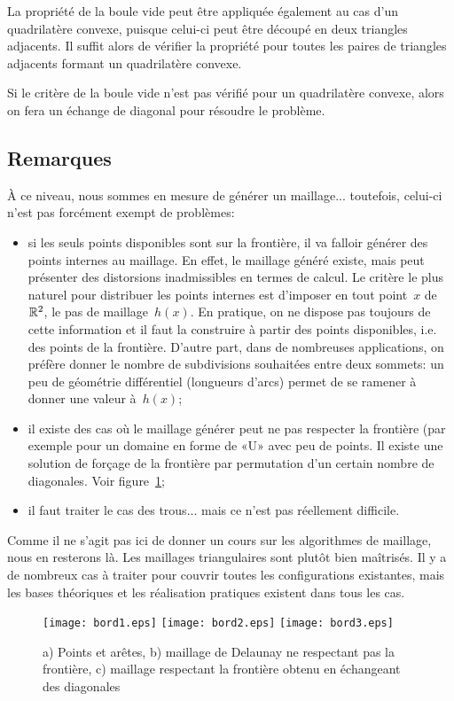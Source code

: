 \medskip
La propriété de la boule vide peut être appliquée également au cas d'un quadrilatère convexe, puisque celui-ci peut être découpé en deux triangles adjacents. Il suffit alors de vérifier la propriété pour toutes les paires de triangles adjacents formant un quadrilatère convexe.

Si le critère de la boule vide n'est pas vérifié pour un quadrilatère convexe, alors on fera un échange de diagonal pour résoudre le problème.

\medskip
\subsection{Remarques}

À ce niveau, nous sommes en mesure de générer un maillage... toutefois, celui-ci n'est pas forcément exempt de problèmes:
\begin{itemize}
   \item si les seuls points disponibles sont sur la frontière, il va falloir générer des points internes au maillage. En effet, le maillage généré existe, mais peut présenter des distorsions inadmissibles en termes de calcul. Le critère le plus naturel pour distribuer les points internes est d'imposer en tout point~$x$ de~$\mathbb R^2$, le pas de maillage~$h(x)$. En pratique, on ne dispose pas toujours de cette information et il faut la construire à partir des points disponibles, i.e. des points de la frontière. D'autre part, dans de nombreuses applications, on préfère donner le nombre de subdivisions souhaitées entre deux sommets: un peu de géométrie différentiel (longueurs d'arcs) permet de se ramener à donner une valeur à~$h(x)$;
   \item il existe des cas où le maillage générer peut ne pas respecter la frontière (par exemple pour un domaine en forme de «U» avec peu de points. Il existe une solution de forçage de la frontière par permutation d'un certain nombre de diagonales. Voir figure~\ref{Fig-Mbord};
   \item il faut traiter le cas des trous... mais ce n'est pas réellement difficile.
\end{itemize}
Comme il ne s'agit pas ici de donner un cours sur les algorithmes de maillage, nous en resterons là. Les maillages triangulaires sont plutôt bien maîtrisés. Il y a de nombreux cas à traiter pour couvrir toutes les configurations existantes, mais les bases théoriques et les réalisation pratiques existent dans tous les cas.
\begin{figure}[htb]
\begin{center}
\texttt{[image: bord1.eps]} \hspace{2em} \texttt{[image: bord2.eps]} \hspace{2em} \texttt{[image: bord3.eps]}
\end{center}
\caption{a) Points et arêtes, b) maillage de Delaunay ne respectant pas la frontière, c) maillage respectant la frontière obtenu en échangeant des diagonales}\label{Fig-Mbord}
\end{figure}

